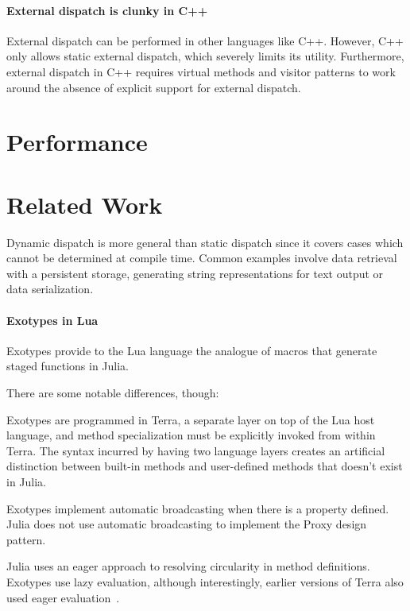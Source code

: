 \documentclass[pldi]{sigplanconf-pldi15}
\begin{document}
\paragraph{External dispatch is clunky in C++}
External dispatch can be performed in other languages like C++. However,
C++ only allows static external dispatch, which severely limits its utility.
Furthermore, external dispatch in C++ requires virtual methods and visitor
patterns\cite{designpatterns} to work around the absence of explicit support
for external dispatch.



\section{Performance}


\section{Related Work}

Dynamic dispatch is more general than static dispatch since it covers cases
which cannot be determined at compile time.  Common examples involve data
retrieval with a persistent storage, generating string representations for text
output or data serialization.\cite{Shields1998}

\paragraph{Exotypes in Lua}
Exotypes\cite{exotypes} provide to the Lua language\cite{lua} the analogue of
macros that generate staged functions\cite{stagedfunc} in Julia.

There are some notable differences, though:

Exotypes are programmed in Terra,\cite{terra} a separate layer on top of the
Lua host language, and method specialization must be explicitly invoked from
within Terra. The syntax incurred by having two language layers creates an
artificial distinction between built-in methods and user-defined methods that
doesn't exist in Julia.

Exotypes implement automatic broadcasting when there is a
 property defined. Julia does not use automatic
broadcasting to implement the Proxy design pattern.

Julia uses an eager approach to resolving circularity in method definitions.
Exotypes use lazy evaluation, although interestingly, earlier versions of Terra
also used eager evaluation~\cite{terra}.
\end{document}
